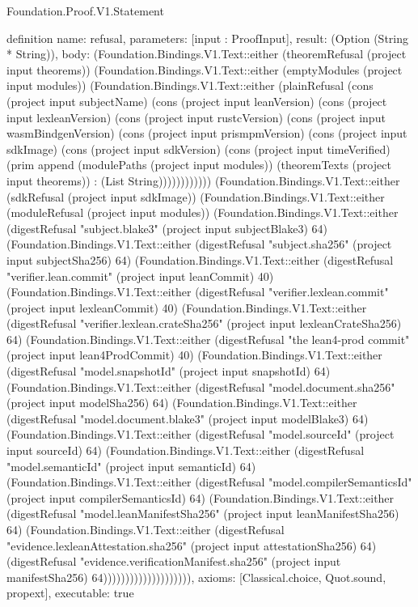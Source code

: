 \begin{lexlean}{Foundation.Proof.V1.Statement}
\begin{semanticmodule}
definition{
  name: refusal,
  parameters: [input : ProofInput],
  result: (Option (String * String)),
  body: (Foundation.Bindings.V1.Text::either (theoremRefusal (project input theorems)) (Foundation.Bindings.V1.Text::either (emptyModules (project input modules)) (Foundation.Bindings.V1.Text::either (plainRefusal (cons (project input subjectName) (cons (project input leanVersion) (cons (project input lexleanVersion) (cons (project input rustcVersion) (cons (project input wasmBindgenVersion) (cons (project input prismpmVersion) (cons (project input sdkImage) (cons (project input sdkVersion) (cons (project input timeVerified) (prim append (modulePaths (project input modules)) (theoremTexts (project input theorems)) : (List String)))))))))))) (Foundation.Bindings.V1.Text::either (sdkRefusal (project input sdkImage)) (Foundation.Bindings.V1.Text::either (moduleRefusal (project input modules)) (Foundation.Bindings.V1.Text::either (digestRefusal "subject.blake3" (project input subjectBlake3) 64) (Foundation.Bindings.V1.Text::either (digestRefusal "subject.sha256" (project input subjectSha256) 64) (Foundation.Bindings.V1.Text::either (digestRefusal "verifier.lean.commit" (project input leanCommit) 40) (Foundation.Bindings.V1.Text::either (digestRefusal "verifier.lexlean.commit" (project input lexleanCommit) 40) (Foundation.Bindings.V1.Text::either (digestRefusal "verifier.lexlean.crateSha256" (project input lexleanCrateSha256) 64) (Foundation.Bindings.V1.Text::either (digestRefusal "the lean4-prod commit" (project input lean4ProdCommit) 40) (Foundation.Bindings.V1.Text::either (digestRefusal "model.snapshotId" (project input snapshotId) 64) (Foundation.Bindings.V1.Text::either (digestRefusal "model.document.sha256" (project input modelSha256) 64) (Foundation.Bindings.V1.Text::either (digestRefusal "model.document.blake3" (project input modelBlake3) 64) (Foundation.Bindings.V1.Text::either (digestRefusal "model.sourceId" (project input sourceId) 64) (Foundation.Bindings.V1.Text::either (digestRefusal "model.semanticId" (project input semanticId) 64) (Foundation.Bindings.V1.Text::either (digestRefusal "model.compilerSemanticsId" (project input compilerSemanticsId) 64) (Foundation.Bindings.V1.Text::either (digestRefusal "model.leanManifestSha256" (project input leanManifestSha256) 64) (Foundation.Bindings.V1.Text::either (digestRefusal "evidence.lexleanAttestation.sha256" (project input attestationSha256) 64) (digestRefusal "evidence.verificationManifest.sha256" (project input manifestSha256) 64)))))))))))))))))))),
  axioms: [Classical.choice, Quot.sound, propext],
  executable: true
}


\end{semanticmodule}
\end{lexlean}
